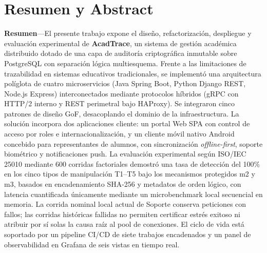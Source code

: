 \documentclass[11pt,a4paper]{article}
\begin{document}
\tableofcontents
\newpage
{}

\section*{Resumen y Abstract}

\noindent\textbf{Resumen}---El presente trabajo expone el dise\~no, refactorizaci\'on, despliegue y evaluaci\'on experimental de \textbf{AcadTrace}, un sistema de gesti\'on acad\'emica distribuido dotado de una capa de auditor\'ia criptogr\'afica inmutable sobre PostgreSQL con separaci\'on l\'ogica multiesquema. Frente a las limitaciones de trazabilidad en sistemas educativos tradicionales, se implement\'o una arquitectura pol\'iglota de cuatro microservicios (Java Spring Boot, Python Django REST, Node.js Express) interconectados mediante protocolos h\'ibridos (gRPC con HTTP/2 interno y REST perimetral bajo HAProxy). Se integraron cinco patrones de dise\~no GoF, desacoplando el dominio de la infraestructura. La soluci\'on incorpora dos aplicaciones cliente: un portal Web SPA con control de acceso por roles e internacionalizaci\'on, y un cliente m\'ovil nativo Android concebido para representantes de alumnos, con sincronizaci\'on \textit{offline-first}, soporte biom\'etrico y notificaciones push. La evaluaci\'on experimental seg\'un ISO/IEC 25010 mediante 600 corridas factoriales demostr\'o una tasa de detecci\'on del 100\% en los cinco tipos de manipulaci\'on T1--T5 bajo los mecanismos protegidos m2 y m3, basados en encadenamiento SHA-256 y metadatos de orden l\'ogico, con latencia cuantificada únicamente mediante un microbenchmark local secuencial en memoria. La corrida nominal local actual de Soporte conserva \CargaPeticiones{} peticiones con \CargaFallos{} fallos; las corridas históricas fallidas no permiten certificar estrés exitoso ni atribuir por sí solas la causa raíz al pool de conexiones. El ciclo de vida est\'a soportado por un pipeline CI/CD de siete trabajos encadenados y un panel de observabilidad en Grafana de seis vistas en tiempo real.\par
\end{document}
